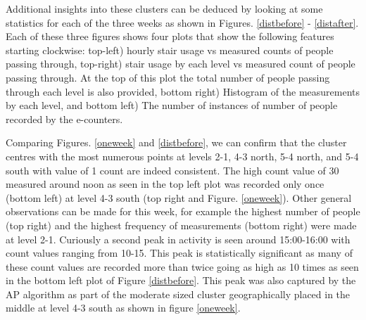  
Additional insights into these clusters can be deduced by looking at some statistics for each of the three weeks as shown in Figures. \ref{distbefore} - \ref{distafter}. Each of these three figures shows four plots that show the following features starting clockwise: top-left) hourly stair usage vs measured counts of people passing through, top-right) stair usage by each level vs measured count of people passing through. At the top of this plot the total number of people passing through each level is also provided, bottom right) Histogram of the measurements by each level, and bottom left) The number of instances of number of people recorded by the e-counters.


Comparing Figures. \ref{oneweek} and \ref{distbefore}, we can confirm that the cluster centres with the most numerous points at levels 2-1, 4-3 north, 5-4 north, and 5-4 south  with value of 1 count are indeed consistent. The high count value of 30 measured around noon as seen in the top left plot was recorded only once (bottom left) at level 4-3 south (top right and Figure. \ref{oneweek}). Other general observations can be made for this week, for example the highest number of people (top right) and the highest frequency of measurements (bottom right) were made at level 2-1. Curiously a second peak in activity is seen around 15:00-16:00 with count values ranging from 10-15. This peak is statistically significant as many of these count values are recorded more than twice going as high as 10 times as seen in the bottom left plot of Figure \ref{distbefore}. This peak was also captured by the AP algorithm as part of the moderate sized cluster geographically placed in the middle at level 4-3 south as shown in figure \ref{oneweek}.
